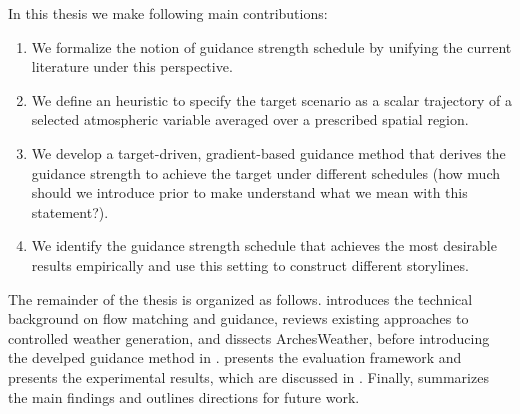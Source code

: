In this thesis we make following main contributions:

\begin{enumerate}[noitemsep]
\item We formalize the notion of guidance strength schedule by unifying the current literature under this perspective.
\item We define an heuristic to specify the target scenario as a scalar trajectory of a
selected atmospheric variable averaged over a prescribed spatial region.
\item We develop a target-driven, gradient-based guidance method that derives the guidance strength to achieve the target under different schedules (how much should we introduce prior to make understand what we mean with this statement?). 
\item We identify the guidance strength schedule that achieves the most desirable results empirically and use this setting to construct different storylines.
\end{enumerate}


The remainder of the thesis is organized as follows.
 introduces the technical background on flow matching and
guidance, reviews existing approaches to controlled weather generation, and
dissects ArchesWeather, before introducing the develped guidance method in .
 presents the evaluation framework and 
 presents the experimental results, which are discussed in
.
Finally,  summarizes the main findings and outlines
directions for future work.